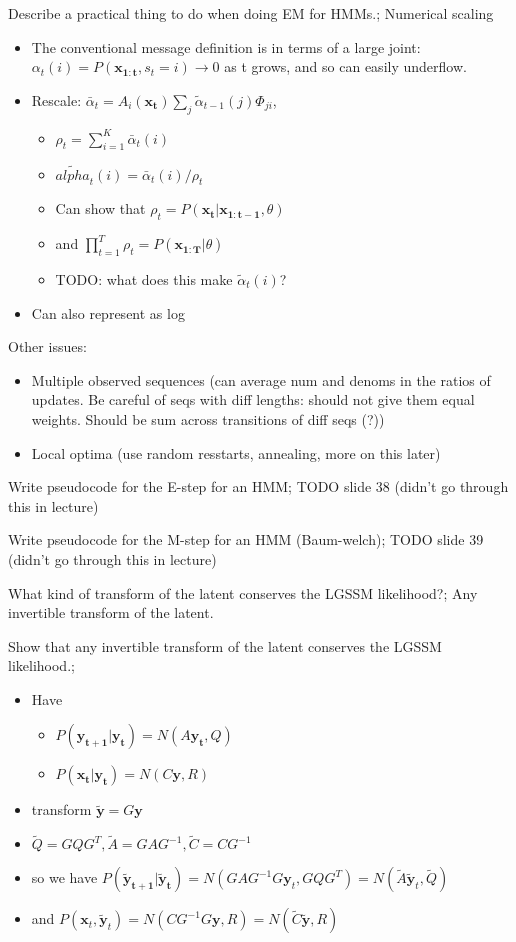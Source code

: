 \documentclass{article}
\begin{document}
Describe a practical thing to do when doing EM for HMMs.; Numerical scaling \begin{itemize} \item The conventional message definition is in terms of a large joint: $\alpha_t(i)=P(\mathbf{x_{1:t}},s_t=i)\rightarrow 0$ as t grows, and so can easily underflow. \item Rescale: $\bar{\alpha}_t=A_i(\mathbf{x_t})\sum_j\tilde{\alpha}_{t-1}(j)\Phi_{ji}$, \begin{itemize} \item $\rho_t = \sum_{i=1}^K\bar{\alpha}_t(i)$ \item $\tilde{alpha}_t(i)=\bar{\alpha}_t(i)/\rho_t$ \item Can show that $\rho_t=P(\mathbf{x_t|x_{1:t-1}}, \theta)$ \item and $\prod_{t=1}^T\rho_t = P(\mathbf{x_{1:T}}|\theta)$ \item TODO: what does this make $\tilde{\alpha}_t(i)$? \end{itemize} \item Can also represent as log \end{itemize} Other issues: \begin{itemize} \item Multiple observed sequences (can average num and denoms in the ratios of updates. Be careful of seqs with diff lengths: should not give them equal weights. Should be sum across transitions of diff seqs (?)) \item Local optima (use random resstarts, annealing, more on this later) \end{itemize}

Write pseudocode for the E-step for an HMM; TODO slide 38 (didn't go through this in lecture)

Write pseudocode for the M-step for an HMM (Baum-welch); TODO slide 39 (didn't go through this in lecture)

What kind of transform of the latent conserves the LGSSM likelihood?; Any invertible transform of the latent. 

Show that any invertible transform of the latent conserves the LGSSM likelihood.; \begin{itemize} \item Have \begin{itemize} \item $P(\mathbf{y_{t+1}|y_t})=N(A\mathbf{y_t}, Q)$ \item $P(\mathbf{x_{t}|y_t})=N(C\mathbf{y}, R)$  \end{itemize} \item transform $\tilde{\mathbf{y}}=G\mathbf{y}$ \item $\tilde{Q}=GQG^T, \tilde{A}=GAG^{-1}, \tilde{C}=CG^{-1}$ \item so we have $P(\mathbf{\tilde{y}_{t+1}|\tilde{y}_t})=N(GAG^{-1}G\mathbf{y}_t, GQG^T)=N(\tilde{A}\tilde{\mathbf{y}}_t, \tilde{Q})$ \item and $P(\mathbf{x}_t, \mathbf{\tilde{y}}_t)=N(CG^{-1}G\mathbf{y}, R)=N(\tilde{C}\tilde{\mathbf{y}}, R)$ \end{itemize}
\end{document}
